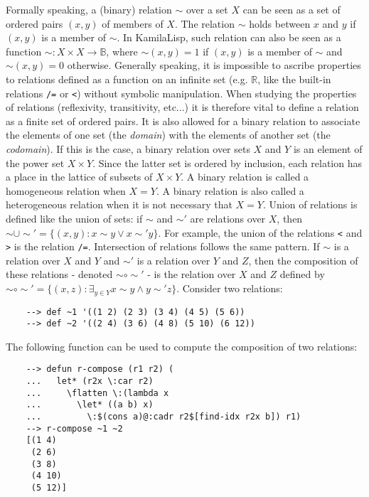 Formally speaking, a (binary) relation $\sim$ over a set $X$ can be seen as a set of ordered pairs $(x, y)$ of members of $X$. The relation $\sim$ holds between $x$ and $y$ if $(x, y)$ is a member of $\sim$. In KamilaLisp, such relation can also be seen as a function $\sim : X \times X \rightarrow \mathbb{B}$, where $\sim(x, y) = 1$ if $(x, y)$ is a member of $\sim$ and $\sim(x, y) = 0$ otherwise. Generally speaking, it is impossible to ascribe properties to relations defined as a function on an infinite set (e.g. $\mathbb{R}$, like the built-in relations \verb|/=| or \verb|<|) without symbolic manipulation. When studying the properties of relations (reflexivity, transitivity, etc...) it is therefore vital to define a relation as a finite set of ordered pairs. It is also allowed for a binary relation to associate the elements of one set (the \textit{domain}) with the elements of another set (the \textit{codomain}). If this is the case, a binary relation over sets $X$ and $Y$ is an element of the power set $X\times Y$. Since the latter set is ordered by inclusion, each relation has a place in the lattice of subsets of $X\times Y$. A binary relation is called a homogeneous relation when $X = Y$. A binary relation is also called a heterogeneous relation when it is not necessary that $X = Y$. Union of relations is defined like the union of sets: if $\sim$ and $\sim'$ are relations over $X$, then $\sim \cup \sim' = \{(x,y):x\sim y \vee x \sim' y\}$. For example, the union of the relations \verb|<| and \verb|>| is the relation \verb|/=|. Intersection of relations follows the same pattern. If $\sim$ is a relation over $X$ and $Y$ and $\sim'$ is a relation over $Y$ and $Z$, then the composition of these relations - denoted $\sim \circ \sim'$ - is the relation over $X$ and $Z$ defined by $\displaystyle \sim \circ \sim' = \{(x,z):\exists_{y \in Y} x \sim y \wedge y \sim' z\}$. Consider two relations:

\begin{Verbatim}
    --> def ~1 '((1 2) (2 3) (3 4) (4 5) (5 6))
    --> def ~2 '((2 4) (3 6) (4 8) (5 10) (6 12))
\end{Verbatim}

The following function can be used to compute the composition of two relations:

\begin{Verbatim}
    --> defun r-compose (r1 r2) (
    ...   let* (r2x \:car r2)
    ...     \flatten \:(lambda x
    ...       \let* ((a b) x)
    ...         \:$(cons a)@:cadr r2$[find-idx r2x b]) r1)
    --> r-compose ~1 ~2
    [(1 4)
     (2 6)
     (3 8)
     (4 10)
     (5 12)]
\end{Verbatim}

